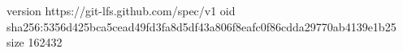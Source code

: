 version https://git-lfs.github.com/spec/v1
oid sha256:5356d425bca5cead49fd3fa8d5df43a806f8eafc0f86cdda29770ab4139e1b25
size 162432
